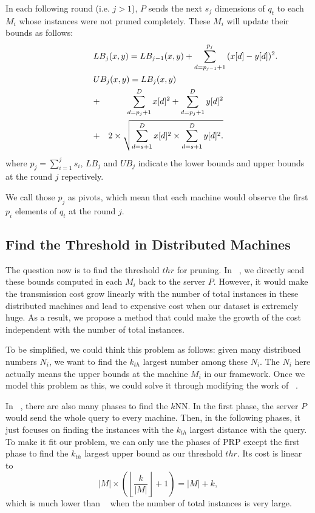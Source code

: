 In each following round (i.e. $j>1$), $P$ sends the next $s_j$ dimensions of $q_t$ to each $M_i$ whose instances were not pruned completely.  These $M_i$ will update their bounds as follows:
{
\begin{eqnarray}
\lefteqn{LB_j(x,y) = LB_{j-1}(x,y)+\sum^{p_j}_{d=p_{j-1}+1}{(x[d]-y[d])^2}.} \label{eq:single-LB} \\
\lefteqn{UB_j(x,y) = LB_{j}(x,y)} \notag \\
& + & \sum^D_{d=p_j+1}{x[d]^2}+\sum^D_{d=p_j+1}{y[d]^2} \notag \\
& + & 2 \times \sqrt{\sum^D_{d=s+1}{x[d]^2}\times \sum^D_{d=s+1}{y[d]^2}.}\label{eq:single-UB}
\end{eqnarray}
}
where $p_j=\sum^j_{i=1}{s_i}$, $LB_j$ and $UB_j$ indicate the lower bounds and upper bounds at the round $j$ repectively.

We call those $p_j$ as pivots, which mean that each machine would observe the first $p_i$ elements of $q_t$ at the round $j$.  

\providecommand{\myceil}[1]{\left \lceil #1 \right \rceil }
\providecommand{\myfloor}[1]{\left \lfloor #1 \right \rfloor }

\subsection{Find the Threshold in Distributed Machines} %
\label{ss:find_the_threshold_in_distributed_machines}
The question now is to find the threshold $thr$ for pruning. In ~\cite{MsWave}, we directly send these bounds computed in each $M_i$ back to the server $P$.  However, it would make the transmission cost grow linearly with the number of total instances in these distributed machines and lead to expensive cost when our dataset is extremely huge.  As a result, we propose a method that could make the growth of the cost independent with the number of total instances.

To be simplified, we could think this problem as follows: given many distribued numbers $N_i$, we want to find the $k_{th}$ largest number among these $N_i$.  The $N_i$ here actually means the upper bounds at the machine $M_i$ in our framework.  Once we model this problem as this, we could solve it through modifying the work of ~\cite{PRP}.

In ~\cite{PRP}, there are also many phases to find the $k$NN.  In the first phase, the server $P$ would send the whole query to every machine.  Then, in the following phases, it just focuses on finding the instances with the $k_{th}$ largest distance with the query.  To make it fit our problem, we can only use the phases of PRP except the first phase to find the $k_{th}$ largest upper bound as our threshold $thr$.  Its cost is linear to
\[
|M|\times (\myfloor{\frac{k}{|M|}}+1)=|M|+k,
\] which is much lower than ~\cite{MsWave} when the number of total instances is very large.

